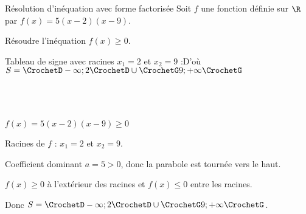 \begin{EXO}{Résolution d'inéquation avec forme factorisée}{}
Soit $f$ une fonction définie sur $\R$ par $f(x) = 5(x-2)(x-9)$. 

 Résoudre l'inéquation $f(x)\geqslant0$.

\begin{crep}
Tableau de signe avec racines $x_1 = 2$ et $x_2 = 9$ :\hfill D'où $S = \CrochetD-\infty;2\CrochetD \cup \CrochetG9;+\infty\CrochetG$\\\\\\\\

\vspace{0.2cm}\begin{center}
\end{center}

\end{crep}

\exocorrection

$f(x) = 5(x-2)(x-9) \geqslant 0$

Racines de $f$ : $x_1 = 2$ et $x_2 = 9$.

Coefficient dominant $a = 5 > 0$, donc la parabole est tournée vers le haut.

$f(x) \geqslant 0$ à l'extérieur des racines et $f(x) \leqslant 0$ entre les racines.

Donc $S = \CrochetD-\infty;2\CrochetD \cup \CrochetG9;+\infty\CrochetG$.
\end{EXO}